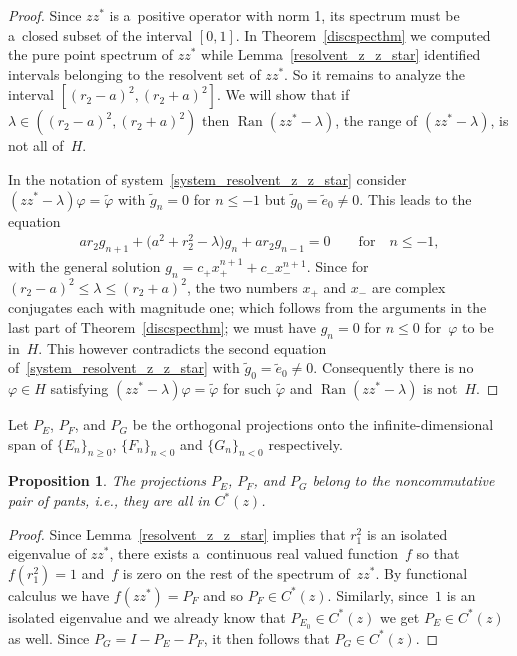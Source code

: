 \documentclass[pdftex]{sigma}
\numberwithin{equation}{section}
\newtheorem{Proposition}[Theorem]{Proposition}
{ \theoremstyle{definition}
\newtheorem{Definition}[Theorem]{Definition}
\newtheorem{Remark}[Theorem]{Remark} }
\begin{document}
\begin{proof}
Since $zz^*$ is a~positive operator with norm 1, its spectrum must be a~closed subset of the interval $[0,1]$.
In Theorem~\ref{discspecthm} we computed the pure point spectrum of $zz^*$ while Lemma~\ref{resolvent_z_z_star}
identif\/ied intervals belonging to the resolvent set of $zz^*$.
So it remains to analyze the interval $[(r_2-a)^2,(r_2+a)^2]$.
We will show that if $\lambda\in((r_2-a)^2,(r_2+a)^2)$ then $\operatorname{Ran}(zz^*-\lambda)$, the range of $(zz^*-\lambda)$, is not
all of~$H$.

In the notation of system~\eqref{system_resolvent_z_z_star} consider $(zz^*-\lambda)\varphi=\tilde{\varphi}$ with
$\tilde{g}_n=0$ for $n\leq -1$ but $\tilde{g}_0=\tilde{e}_0 \ne 0$.
This leads to the equation
\begin{gather*}
ar_2g_{n+1}+\big(a^2+r_2^2-\lambda\big)g_n+ar_2g_{n-1}=0 \qquad\text{for}\quad  n\leq -1,
\end{gather*}
with the general solution $g_n=c_+x_+^{n+1}+c_-x_-^{n+1}$.
Since for $(r_2-a)^2\leq\lambda\leq (r_2+a)^2$, the two numbers $x_+$ and $x_-$ are complex conjugates each with
magnitude one; which follows from the arguments in the last part of Theorem~\ref{discspecthm}; we must have $g_n =0$ for
$n\leq 0$ for~$\varphi$ to be in~$H$.
This however contradicts the second equation of~\eqref{system_resolvent_z_z_star} with $\tilde{g}_0=\tilde{e}_0 \ne 0$.
Consequently there is no $\varphi\in H$ satisfying $(zz^*-\lambda)\varphi=\tilde{\varphi}$ for such $\tilde{\varphi}$
and $\operatorname{Ran}(zz^*-\lambda)$ is not~$H$.
\end{proof}

Let $P_E$, $P_F$, and $P_G$ be the orthogonal projections onto the inf\/inite-dimensional span of $\{E_n\}_{n\geq 0}$,
$\{F_n\}_{n< 0}$ and $\{G_n\}_{n< 0}$ respectively.

\begin{Proposition}
The projections $P_E$, $P_F$, and $P_G$ belong to the noncommutative pair of pants, i.e., they are all in $C^*(z)$.
\end{Proposition}

\begin{proof}
Since Lemma~\ref{resolvent_z_z_star} implies that $r_1^2$ is an isolated eigenvalue of $zz^*$, there exists a~continuous
real valued function~$f$ so that $f(r_1^2)=1$ and~$f$ is zero on the rest of the spectrum of~$zz^*$.
By functional calculus we have $f(zz^*)=P_F$ and so $P_F\in C^*(z)$.
Similarly, since~$1$ is an isolated eigenvalue and we already know that $P_{E_0}\in C^*(z)$ we get $P_E\in C^*(z)$ as
well.
Since $P_G=I-P_E-P_F$, it then follows that $P_G\in C^*(z)$.
\end{proof}
\end{document}
